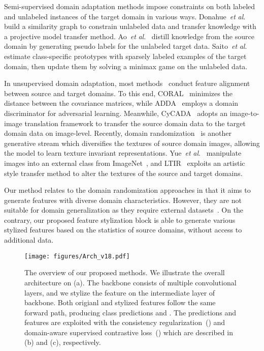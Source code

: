 \documentclass[sigconf]{acmart}
\newcommand{\etal}{\textit{et} \textit{al}.}
\begin{document}
Semi-supervised domain adaptation methods impose constraints on both labeled and unlabeled instances of the target domain in various ways. Donahue~\etal~\cite{donahue2013semi} build a similarity graph to constrain unlabeled data and transfer knowledge with a projective model transfer method. Ao~\etal~\cite{ao2017fast} distill knowledge from the source domain by generating pseudo labels for the unlabeled target data. Saito~\etal~\cite{saito2019semi} estimate class-specific prototypes with sparsely labeled examples of the target domain, then update them by solving a minimax game on the unlabeled data.

In unsupervised domain adaptation, most methods~\cite{daume2009frustratingly, sun2016return, tzeng2017adversarial, hoffman2018cycada, kim2020learning} conduct feature alignment between source and target domains. To this end, CORAL~\cite{sun2016return} minimizes the distance between the covariance matrices, while ADDA~\cite{tzeng2017adversarial} employs a domain discriminator for adversarial learning. Meanwhile, CyCADA~\cite{hoffman2018cycada} adopts an image-to-image translation framework to transfer the source domain data to the target domain data on image-level.
Recently, domain randomization~\cite{tobin2017domain, yue2019domain, zakharov2019deceptionnet, kim2020learning} is another generative stream which diversifies the textures of source domain images, allowing the model to learn texture invariant representations. Yue~\etal~\cite{yue2019domain} manipulate images into an external class from ImageNet~\cite{krizhevsky2012imagenet}, and LTIR~\cite{kim2020learning} exploits an artistic style transfer method to alter the textures of the source and target domains.

Our method relates to the domain randomization approaches in that it aims to generate features with diverse domain characteristics.
However, they are not suitable for domain generalization as they require external datasets~\cite{krizhevsky2012imagenet, yue2019domain, kim2020learning}.
On the contrary, our proposed feature stylization block is able to generate various stylized features based on the statistics of source domains, without access to additional data.


\begin{figure*}
  \texttt{[image: figures/Arch\_v18.pdf]}
  \caption{The overview of our proposed methods. We illustrate the overall architecture on (a). The backbone consists of multiple convolutional layers, and we stylize the feature on the intermediate layer of backbone. Both origianl and stylized features follow the same forward path, producing class predictions  and . The predictions and features are exploited with the consistency regularization~() and domain-aware supervised contrastive loss~() which are described in (b) and (c), respectively.}
  \label{fig:Arch}
\end{figure*}
\end{document}
